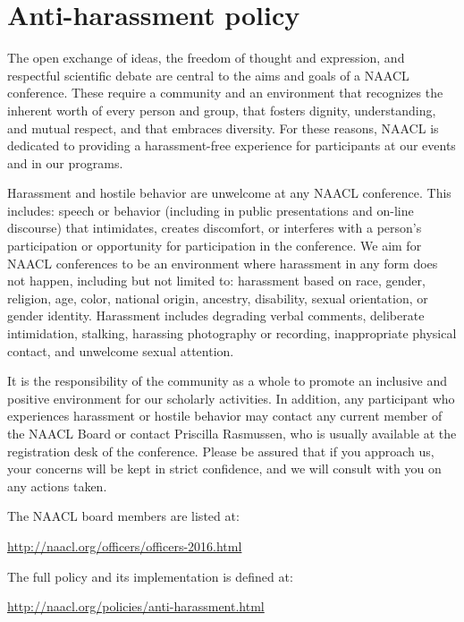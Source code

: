 \chapter[Anti-harassment policy]{Anti-harassment policy}
\thispagestyle{emptyheader}
\setheaders{}{}

The open exchange of ideas, the freedom of thought and expression, and
respectful scientific debate are central to the aims and goals of a
NAACL conference. These require a community and an environment that
recognizes the inherent worth of every person and group, that fosters
dignity, understanding, and mutual respect, and that embraces
diversity. For these reasons, NAACL is dedicated to providing a
harassment-free experience for participants at our events and in our
programs. 

Harassment and hostile behavior are unwelcome at any NAACL
conference. This includes: speech or behavior (including in public
presentations and on-line discourse) that intimidates, creates
discomfort, or interferes with a person’s participation or opportunity
for participation in the conference. We aim for NAACL conferences to
be an environment where harassment in any form does not happen,
including but not limited to: harassment based on race, gender,
religion, age, color, national origin, ancestry, disability, sexual
orientation, or gender identity. Harassment includes degrading verbal
comments, deliberate intimidation, stalking, harassing photography or
recording, inappropriate physical contact, and unwelcome sexual
attention. 

It is the responsibility of the community as a whole to promote an
inclusive and positive environment for our scholarly activities. In
addition, any participant who experiences harassment or hostile
behavior may contact any current member of the NAACL Board or contact
Priscilla Rasmussen, who is usually available at the registration desk
of the conference. Please be assured that if you approach us, your
concerns will be kept in strict confidence, and we will consult with
you on any actions taken. 

The NAACL board members are listed at:

\url{http://naacl.org/officers/officers-2016.html}

The full policy and its implementation is defined at:

\url{http://naacl.org/policies/anti-harassment.html}

